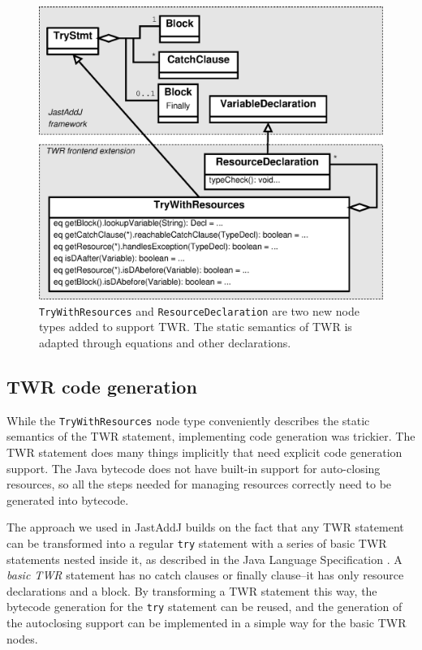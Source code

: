 {\begin{figure}
	\centering
	\includegraphics[width=\columnwidth]{figures/TWRextension.eps}
	\caption{\texttt{TryWithResources} and \texttt{ResourceDeclaration} are two new node types added to support TWR. The static semantics of TWR is adapted through equations and other declarations.}
	\label{TWRextension}
\end{figure}

\subsection{TWR code generation}

While the \verb'TryWithResources' node type conveniently describes the static semantics of the
TWR statement, implementing code generation was trickier.
The TWR statement does many things implicitly that need explicit code
generation support.  The Java bytecode does not have built-in support for
auto-closing resources, so all the steps needed for managing resources
correctly need to be generated into bytecode.

The approach we used in JastAddJ builds on the fact that any TWR statement can be transformed into a regular \texttt{try} statement with a series of basic TWR statements nested inside it, as described in the Java Language Specification \cite[p. 408]{jls7}. A \emph{basic TWR} statement has no catch clauses or finally clause--it has only resource declarations and a block. By transforming a TWR statement this way, the bytecode generation for the \texttt{try} statement can be reused, and the generation of the autoclosing support can be implemented in a simple way for the basic TWR nodes.

}
